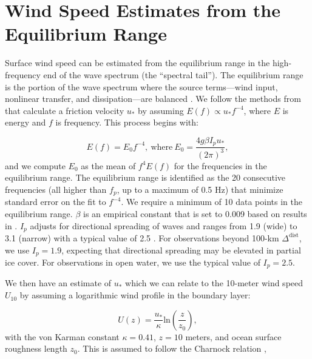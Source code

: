 \documentclass [11pt, proquest] {uwthesis}[2020/02/24]
\begin{document}
\chapter{Wind Speed Estimates from the Equilibrium Range}
\label{u10-method}

Surface wind speed can be estimated from the equilibrium range in the high-frequency end of the wave spectrum (the ``spectral tail''). The equilibrium range is the portion of the wave spectrum where the source terms---wind input, nonlinear transfer, and dissipation---are balanced \cite{Phillips1985SpectralWaves}. We follow the methods from \cite{Thomson2013WavesP, Voermans2020EstimatingSpectra} that calculate a friction velocity $u_{\ast}$ by assuming $E(f) \propto u_{\ast} f^{-4}$, where $E$ is energy and $f$ is frequency. This process begins with:


\begin{equation}
E(f) = E_0 f^{-4},\mathrm{\ where \ }E_0 = \frac{4 g \beta I_p u_{\ast}} {(2 \pi)^3},
\label{eq:E_0}
\end{equation}
\noindent 
and we compute $E_0$ as the mean of $f^4 E(f)$ for the frequencies in the equilibrium range. The equilibrium range is identified as the 20 consecutive frequencies (all higher than $f_p$, up to a maximum of 0.5 Hz) that minimize standard error on the fit to $f^{-4}$. We require a minimum of 10 data points in the equilibrium range. $\beta$ is an empirical constant that is set to 0.009 based on results in \cite{Voermans2020EstimatingSpectra}. $I_p$ adjusts for directional spreading of waves and ranges from 1.9 (wide) to 3.1 (narrow) \cite{Juszko1995WindTheory} with a typical value of 2.5 \cite{Thomson2013WavesP}. For observations beyond 100-km $\Delta^{\mathrm{dist}}$, we use $I_p = 1.9$, expecting that directional spreading may be elevated in partial ice cover. For observations in open water, we use the typical value of $I_p = 2.5$.  

We then have an estimate of $u_{\ast}$ which we can relate to the 10-meter wind speed $U_{10}$ by assuming a logarithmic wind profile in the boundary layer: 

\begin{equation}
U(z) = \frac{u_{\ast}}{\kappa} \mathrm{ln} \left( \frac{z}{z_0} \right),
\label{eq:u10log}
\end{equation}
\noindent
with the von Karman constant $\kappa = 0.41$, $z = 10$ meters, and ocean surface roughness length $z_0$. This is assumed to follow the Charnock relation \cite{Charnock1955WindSurface},
\end{document}
